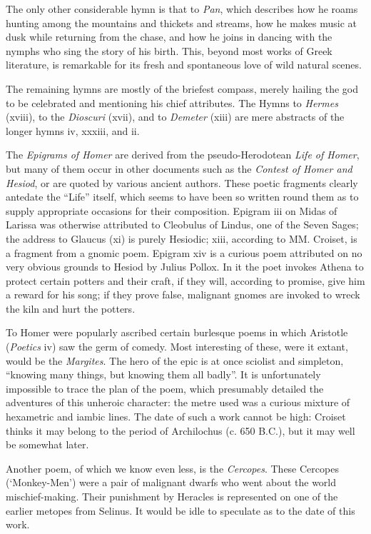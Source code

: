 The only other considerable hymn is that to \emph{Pan}, which describes how he
roams hunting among the mountains and thickets and streams, how he makes music
at dusk while returning from the chase, and how he joins in dancing with the
nymphs who sing the story of his birth. This, beyond most works of Greek
literature, is remarkable for its fresh and spontaneous love of wild natural
scenes.

The remaining hymns are mostly of the briefest compass, merely hailing the god
to be celebrated and mentioning his chief attributes. The Hymns to
\emph{Hermes} (xviii), to the \emph{Dioscuri} (xvii), and to \emph{Demeter}
(xiii) are mere abstracts of the longer hymns iv, xxxiii, and ii.


The \emph{Epigrams of Homer} are derived from the pseudo-Herodotean \emph{Life of
Homer}, but many of them occur in other documents such as the \emph{Contest of
Homer and Hesiod}, or are quoted by various ancient authors. These poetic
fragments clearly antedate the “Life” itself, which seems to have
been so written round them as to supply appropriate occasions for their
composition. Epigram iii on Midas of Larissa was otherwise attributed to
Cleobulus of Lindus, one of the Seven Sages; the address to Glaucus (xi) is
purely Hesiodic; xiii, according to MM. Croiset, is a fragment from a gnomic
poem. Epigram xiv is a curious poem attributed on no very obvious grounds to
Hesiod by Julius Pollox. In it the poet invokes Athena to protect certain
potters and their craft, if they will, according to promise, give him a reward
for his song; if they prove false, malignant gnomes are invoked to wreck the
kiln and hurt the potters.


To Homer were popularly ascribed certain burlesque poems in which Aristotle
(\emph{Poetics} iv) saw the germ of comedy. Most interesting of these, were it
extant, would be the \emph{Margites}. The hero of the epic is at once sciolist
and simpleton, “knowing many things, but knowing them all badly”.
It is unfortunately impossible to trace the plan of the poem, which presumably
detailed the adventures of this unheroic character: the metre used was a
curious mixture of hexametric and iambic lines. The date of such a work cannot
be high: Croiset thinks it may belong to the period of Archilochus (c. 650
B.C.), but it may well be somewhat later.

Another poem, of which we know even less, is the \emph{Cercopes}. These
Cercopes (‘Monkey-Men’) were a pair of malignant dwarfs who went
about the world mischief-making. Their punishment by Heracles is represented on
one of the earlier metopes from Selinus. It would be idle to speculate as to
the date of this work.

